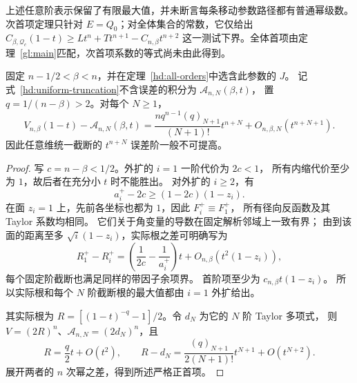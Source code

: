 \begin{remark}[固定资料与一般输入的边界]
上述任意阶表示保留了有限最大值，并未断言每条移动参数路径都有普通幂级数。
次首项定理只针对 $E=Q_0$；对全体集合的常数，它仅给出
$C_{\beta,\mathcal Q_c}(1-t)\ge Lt^n+Tt^{n+1}-C_{n,\beta}t^{n+2}$
这一测试下界。全体首项由定理~\ref{gl:main}匹配，次首项系数的等式尚未由此得到。
\end{remark}

\begin{corollary}[任意维截断阶的sharp性]\label{hd:sharp-truncation}
固定 $n-1/2<\beta<n$，并在定理~\ref{hd:all-orders}中选含此参数的 $J$。
记式~\eqref{hd:uniform-truncation}不含误差的积分为 $\mathcal A_{n,N}(\beta,t)$，
置 $q=1/(n-\beta)>2$。对每个 $N\ge1$，
\[
 V_{n,\beta}(1-t)-\mathcal A_{n,N}(\beta,t)
 =\frac{nq^{n-1}(q)_{N+1}}{(N+1)!}t^{n+N}
       +O_{n,\beta,N}(t^{n+N+1}).
\]
因此任意维统一截断的 $t^{n+N}$ 误差阶一般不可提高。
\end{corollary}
\begin{proof}
写 $c=n-\beta<1/2$。外扩的 $i=1$ 一阶代价为 $2c<1$，
所有内缩代价至少为 $1$，故后者在充分小 $t$ 时不能胜出。
对外扩的 $i\ge2$，有
\[
 a_i^+-2c\ge(1-2c)(1-z_i).
\]
在面 $z_i=1$ 上，先前各坐标也都为 $1$，因此 $F_i^+\equiv F_1^+$，
所有径向反函数及其 Taylor 系数均相同。
它们关于角变量的导数在固定解析邻域上一致有界；
由到该面的距离至多 $\sqrt i(1-z_i)$，实际根之差可明确写为
\[
 R_1^+-R_i^+=\left(\frac1{2c}-\frac1{a_i^+}\right)t
                 +O_{n,\beta}(t^2(1-z_i)),
\]
每个固定阶截断也满足同样的带因子余项界。
首阶项至少为 $c_{n,\beta}t(1-z_i)$。
所以实际根和每个 $N$ 阶截断根的最大值都由 $i=1$ 外扩给出。

其实际根为 $R=[(1-t)^{-q}-1]/2$。令 $d_N$ 为它的 $N$ 阶 Taylor 多项式，
则 $V=(2R)^n$、$\mathcal A_{n,N}=(2d_N)^n$，且
\[
 R=\frac q2t+O(t^2),\qquad
 R-d_N=\frac{(q)_{N+1}}{2(N+1)!}t^{N+1}+O(t^{N+2}).
\]
展开两者的 $n$ 次幂之差，得到所述严格正首项。
\end{proof}
